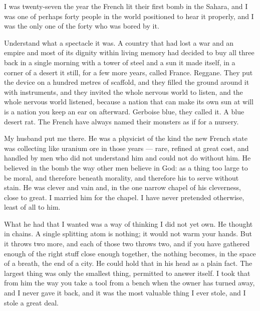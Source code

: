 
I was twenty-seven the year the French lit their first bomb in the Sahara, and I was one of perhaps forty people in the world positioned to hear it properly, and I was the only one of the forty who was bored by it.\par

Understand what a spectacle it was. A country that had lost a war and an empire and most of its dignity within living memory had decided to buy all three back in a single morning with a tower of steel and a sun it made itself, in a corner of a desert it still, for a few more years, called France. Reggane. They put the device on a hundred metres of scaffold, and they filled the ground around it with instruments, and they invited the whole nervous world to listen, and the whole nervous world listened, because a nation that can make its own sun at will is a nation you keep an ear on afterward. Gerboise blue, they called it. A blue desert rat. The French have always named their monsters as if for a nursery.\par

My husband put me there. He was a physicist of the kind the new French state was collecting like uranium ore in those years --- rare, refined at great cost, and handled by men who did not understand him and could not do without him. He believed in the bomb the way other men believe in God: as a thing too large to be moral, and therefore beneath morality, and therefore his to serve without stain. He was clever and vain and, in the one narrow chapel of his cleverness, close to great. I married him for the chapel. I have never pretended otherwise, least of all to him.\par

What he had that I wanted was a way of thinking I did not yet own. He thought in chains. A single splitting atom is nothing; it would not warm your hands. But it throws two more, and each of those two throws two, and if you have gathered enough of the right stuff close enough together, the nothing becomes, in the space of a breath, the end of a city. He could hold that in his head as a plain fact. The largest thing was only the smallest thing, permitted to answer itself. I took that from him the way you take a tool from a bench when the owner has turned away, and I never gave it back, and it was the most valuable thing I ever stole, and I stole a great deal.\par

